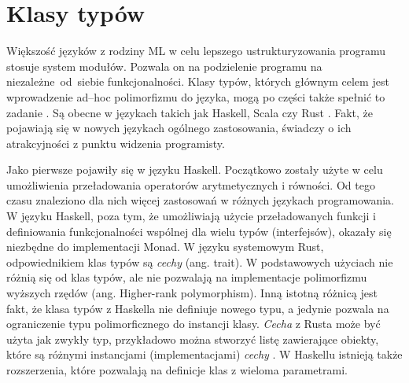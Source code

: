 \documentclass[declaration,shortabstract]{iithesis}
\begin{document}

\section{Klasy typów}
Większość języków z rodziny ML w celu lepszego ustrukturyzowania
programu stosuje system modułów. Pozwala on na podzielenie programu na 
niezależne~od~siebie funkcjonalności.
Klasy typów, których głównym celem jest wprowadzenie 
ad--hoc polimorfizmu do języka, mogą po części także spełnić to zadanie 
\cite{modules_vs_typeclasses}. 
Są obecne w językach takich jak Haskell, Scala\cite{scala_traits} czy Rust
\cite{rust_traits}. Fakt, że pojawiają się
w nowych językach ogólnego zastosowania, świadczy o ich atrakcyjności z punktu 
widzenia programisty. 


Jako pierwsze pojawiły się w języku Haskell\cite{tc_wiki}. 
Początkowo zostały użyte w celu umożliwienia przeładowania operatorów 
arytmetycznych i równości. Od tego czasu
znaleziono dla nich więcej zastosowań w różnych językach programowania. W języku
Haskell, poza tym, że umożliwiają użycie przeładowanych funkcji i definiowania 
funkcjonalności wspólnej dla wielu typów (interfejsów), okazały się niezbędne 
do implementacji Monad. W języku systemowym Rust, odpowiednikiem klas typów są
\textit{cechy} (ang. trait). W podstawowych użyciach nie różnią się od klas typów, ale 
nie pozwalają na implementacje polimorfizmu wyższych rzędów 
\cite{no_hkt_in_rust} (ang. 
Higher-rank polymorphism). Inną istotną różnicą jest fakt, że klasa typów z 
Haskella nie definiuje nowego typu, a jedynie pozwala na ograniczenie typu
polimorficznego do 
instancji klasy. \textit{Cecha} z Rusta może być użyta jak zwykły typ, przykładowo 
można stworzyć listę zawierające obiekty, które są różnymi instancjami 
(implementacjami) \textit{cechy} \cite{traits_as_obj_rust}. W Haskellu istnieją także rozszerzenia, które 
pozwalają na definicje klas z wieloma parametrami. 
\end{document}
